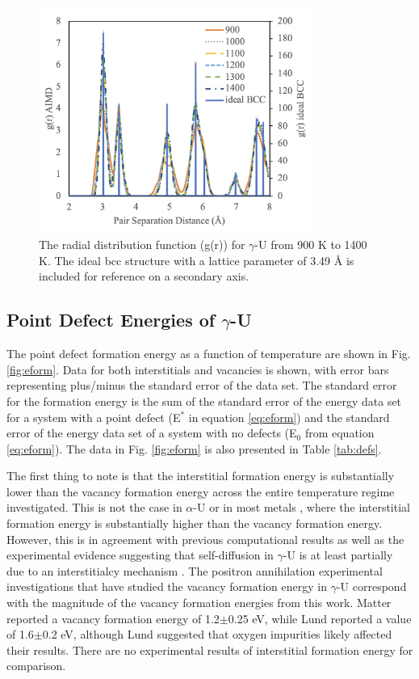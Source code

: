 \documentclass[review]{elsarticle}
\begin{document}
\begin{figure}[h]
 \centering
 \includegraphics[width=0.8\textwidth]{4_rdf.png} 
 \caption{The radial distribution function (g(r)) for $\gamma$-U from 900 K to 1400 K. The ideal bcc structure with a lattice parameter of 3.49 {\AA} is included for reference on a secondary axis.  }
 \label{fig:rdf}
\end{figure}

\FloatBarrier

\subsection{Point Defect Energies of $\gamma$-U}

The point defect formation energy as a function of temperature are shown in Fig. \ref{fig:eform}. Data for both interstitials and vacancies is shown, with error bars representing plus/minus the standard error of the data set. The standard error for the formation energy is the sum of the standard error of the energy data set for a system with a point defect (E$^*$ in equation \ref{eq:eform}) and the standard error of the energy data set of a system with no defects (E$_0$ from equation \ref{eq:eform}). The data in Fig. \ref{fig:eform} is also presented in Table \ref{tab:defs}.

The first thing to note is that the interstitial formation energy is substantially lower than the vacancy formation energy across the entire temperature regime investigated. This is not the case in $\alpha$-U \cite{wirth2011} or in most metals \cite{schultz1968, baskes1979, lee2001, lee2003}, where the interstitial formation energy is substantially higher than the vacancy formation energy. However, this is in agreement with previous computational results \cite{beeler2010} as well as the experimental evidence suggesting that self-diffusion in $\gamma$-U is at least partially due to an interstitialcy mechanism \cite{fedorov1978, smirnov1992, mehrer2011}. The positron annihilation experimental investigations that have studied the vacancy formation energy in $\gamma$-U correspond with the magnitude of the vacancy formation energies from this work. Matter \cite{matter1980} reported a vacancy formation energy of 1.2$\pm$0.25 eV, while Lund \cite{lund2013} reported a value of 1.6$\pm$0.2 eV, although Lund suggested that oxygen impurities likely affected their results. There are no experimental results of interstitial formation energy for comparison.
\end{document}

